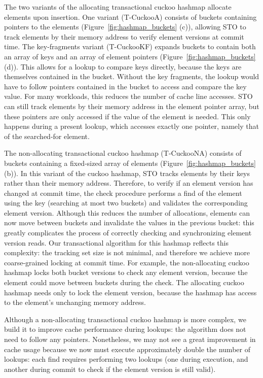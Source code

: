 The two variants of the allocating transactional cuckoo hashmap allocate elements upon insertion. One variant (T-CuckooA) consists of buckets containing pointers to the elements (Figure~\ref{fig:hashmap_buckets} (c)), allowing STO to track elements by their memory address to verify element versions at commit time. The key-fragments variant (T-CuckooKF) expands buckets to contain both an array of keys and an array of element pointers (Figure~\ref{fig:hashmap_buckets} (d)). This allows for a lookup to compare keys directly, because the keys are themselves contained in the bucket. Without the key fragments, the lookup would have to follow pointers contained in the bucket to access and compare the key value. For many workloads, this reduces the number of cache line accesses. STO can still track elements by their memory address in the element pointer array, but these pointers are only accessed if the value of the element is needed. This only happens during a present lookup, which accesses exactly one pointer, namely that of the searched-for element.

The non-allocating transactional cuckoo hashmap (T-CuckooNA) consists of buckets containing a fixed-sized array of elements (Figure~\ref{fig:hashmap_buckets} (b)). In this variant of the cuckoo hashmap, STO tracks elements by their keys rather than their memory address. Therefore, to verify if an element version has changed at commit time, the check procedure performs a find of the element using the key (searching at most two buckets) and validates the corresponding element version. Although this reduces the number of allocations, elements can now move between buckets and invalidate the values in the previous bucket: this greatly complicates the process of correctly checking and synchronizing element version reads. Our transactional algorithm for this hashmap reflects this complexity: the tracking set size is not minimal, and therefore we achieve more coarse-grained locking at commit time. For example, the non-allocating cuckoo hashmap locks both bucket versions to check any element version, because the element could move between buckets during the check. The allocating cuckoo hashmap needs only to lock the element version, because the hashmap has access to the element's unchanging memory address. 

Although a non-allocating transactional cuckoo hashmap is more complex, we build it to improve cache performance during lookups: the algorithm does not need to follow any pointers. Nonetheless, we may not see a great improvement in cache usage because we now must execute approximately double the number of lookups: each find requires performing two lookups (one during execution, and another during commit to check if the element version is still valid).

